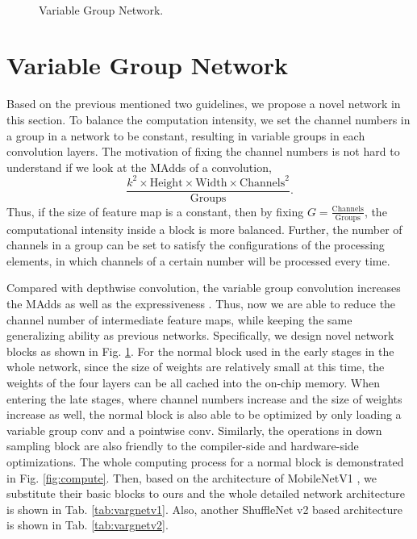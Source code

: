 \documentclass{article}
\begin{document}
\begin{figure}
  \centering
    \quad
   \\
  \caption{Variable Group Network.} \label{fig:vargnet}
\end{figure}

\section{Variable Group Network}
Based on the previous mentioned two guidelines, we propose a novel network in this section. To balance the computation intensity, we set the channel numbers in a group in a network to be constant, resulting in variable groups in each convolution layers. 
The motivation of fixing the channel numbers is not hard to understand if we look at the MAdds of a convolution,
\[
\frac{k^2\times \mathrm{Height} \times \mathrm{Width} \times \mathrm{Channels}^2}{\mathrm{Groups}}.
\]
Thus, if the size of feature map is a constant, then by fixing $G=\frac{\mathrm{Channels}}{\mathrm{Groups}}$, the computational intensity inside a block is more balanced. Further, the number of channels in a group can be set to satisfy the configurations of the processing elements, in which channels of a certain number will be processed every time.

Compared with depthwise convolution, the variable group convolution increases the MAdds as well as the expressiveness \cite{sandler2018mobilenetv2}. Thus, now we are able to reduce the channel number of intermediate feature maps, while keeping the same generalizing ability as previous networks. Specifically, we design novel network blocks as shown in Fig. \ref{fig:vargnet}. For the normal block used in the early stages in the whole network, since the size of weights are relatively small at this time, the weights of the four layers can be all cached into the on-chip memory. When entering the late stages, where channel numbers increase and the size of weights increase as well, the normal block is also able to be optimized by only loading a variable group conv and a pointwise conv. Similarly, the operations in down sampling block are also friendly to the compiler-side and hardware-side optimizations. 
The whole computing process for a normal block is demonstrated in Fig. \ref{fig:compute}.
Then, based on the architecture of MobileNetV1 \cite{howard2017mobilenets}, we substitute their basic blocks to ours and the whole detailed network architecture is shown in Tab. \ref{tab:vargnetv1}. Also, another ShuffleNet v2 based architecture is shown in Tab. \ref{tab:vargnetv2}.
\end{document}
